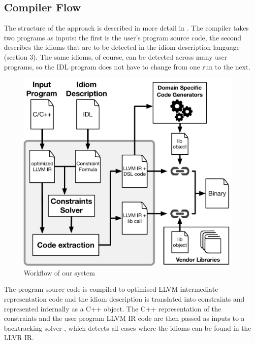 \subsection{Compiler Flow}

    The structure of the approach is described in more detail in
    .
    The compiler takes two programs as inputs: the first is the user's program
    source code, the second describes the idioms that are to be detected in the
    idiom description language (section 3).
    The same idioms, of course, can be detected across many user programs, so
    the IDL program does not have to change from one run to the next.

\begin{figure}[t]
    \centering
    \includegraphics[width=\linewidth]{figures/compiler_flow.pdf}
    \caption{Workflow of our system}
    \label{fig:methodology}
    \vspace{-0.5em}
\end{figure}

    The program source code is compiled to optimised LLVM intermediate
    representation code and the idiom description is translated into constraints
    and represented internally as a C++ object.
    The C++ representation of the constraints and the user program LLVM IR code
    are then passed as inputs to a backtracking solver
    \cite{ginsbach2017discovery}, which detects all cases where the idioms can
    be found in the LLVR IR.

